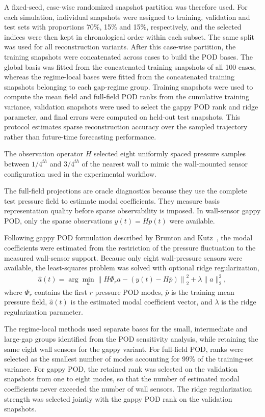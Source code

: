 \documentclass[preprint,12pt]{elsarticle}
\begin{document}
A fixed-seed, case-wise randomized snapshot partition was therefore used. For each simulation, individual snapshots were assigned to training, validation and test sets with proportions 70\%, 15\% and 15\%, respectively, and the selected indices were then kept in chronological order within each subset. The same split was used for all reconstruction variants. After this case-wise partition, the training snapshots were concatenated across cases to build the POD bases. The global basis was fitted from the concatenated training snapshots of all 100 cases, whereas the regime-local bases were fitted from the concatenated training snapshots belonging to each gap-regime group. Training snapshots were used to compute the mean field and full-field POD ranks from the cumulative training variance, validation snapshots were used to select the gappy POD rank and ridge parameter, and final errors were computed on held-out test snapshots. This protocol estimates sparse reconstruction accuracy over the sampled trajectory rather than future-time forecasting performance.

The observation operator $H$ selected eight uniformly spaced pressure samples between $1/4^{th}$ and $3/4^{th}$ of the nearest wall to mimic the wall-mounted sensor configuration used in the experimental workflow.

The full-field projections are oracle diagnostics because they use the complete test pressure field to estimate modal coefficients. They measure basis representation quality before sparse observability is imposed. In wall-sensor gappy POD, only the sparse observations $y(t)=Hp(t)$ were available.

Following gappy POD formulation described by Brunton and Kutz~\citep{BruntonKutz2022}, the modal coefficients were estimated from the restriction of the pressure fluctuation to the measured wall-sensor support. Because only eight wall-pressure sensors were available, the least-squares problem was solved with optional ridge regularization,
\begin{align}
\hat{a}(t)=
\arg\min_a \left\|H\Phi_r a-\left(y(t)-H\overline{p}\right)\right\|_2^2
+\lambda \|a\|_2^2 ,
\end{align}
where $\Phi_r$ contains the first $r$ pressure POD modes, $\overline{p}$ is the training mean pressure field, $\hat{a}(t)$ is the estimated modal coefficient vector, and $\lambda$ is the ridge regularization parameter.

The regime-local methods used separate bases for the small, intermediate and large-gap groups identified from the POD sensitivity analysis, while retaining the same eight wall sensors for the gappy variant. For full-field POD, ranks were selected as the smallest number of modes accounting for 99\% of the training-set variance. For gappy POD, the retained rank was selected on the validation snapshots from one to eight modes, so that the number of estimated modal coefficients never exceeded the number of wall sensors. The ridge regularization strength was selected jointly with the gappy POD rank on the validation snapshots.
\end{document}
